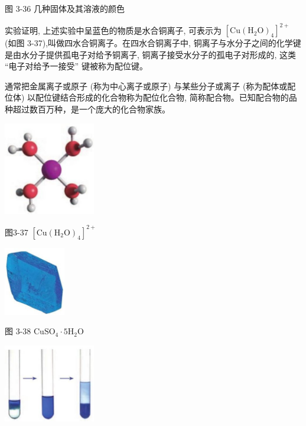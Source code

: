\documentclass[10pt]{article}
\begin{document}
图 3-36 几种固体及其溶液的颜色

实验证明, 上述实验中呈蓝色的物质是水合铜离子, 可表示为 \({\left\lbrack \mathrm{{Cu}}{\left( {\mathrm{H}}_{2}\mathrm{O}\right) }_{4}\right\rbrack }^{2 + }\) (如图 3-37),叫做四水合铜离子。在四水合铜离子中, 铜离子与水分子之间的化学键是由水分子提供孤电子对给予铜离子, 铜离子接受水分子的孤电子对形成的, 这类 “电子对给予一接受” 键被称为配位键。

通常把金属离子或原子 (称为中心离子或原子) 与某些分子或离子 (称为配体或配位体) 以配位键结合形成的化合物称为配位化合物, 简称配合物。已知配合物的品种超过数百万种，是一个庞大的化合物家族。

\begin{center}
\includegraphics[max width=0.3\textwidth]{images/0190e026-5a11-7df7-bd27-54d09026ba7a_99_150945.jpg}
\end{center}

图3-37 \({\left\lbrack \mathrm{{Cu}}{\left( {\mathrm{H}}_{2}\mathrm{O}\right) }_{4}\right\rbrack }^{2 + }\)

\begin{center}
\includegraphics[max width=0.2\textwidth]{images/0190e026-5a11-7df7-bd27-54d09026ba7a_99_554903.jpg}
\end{center}

图 3-38 \({\mathrm{{CuSO}}}_{4} \cdot 5{\mathrm{H}}_{2}\mathrm{O}\)

\begin{center}
\includegraphics[max width=0.3\textwidth]{images/0190e026-5a11-7df7-bd27-54d09026ba7a_99_539678.jpg}
\end{center}
\end{document}
